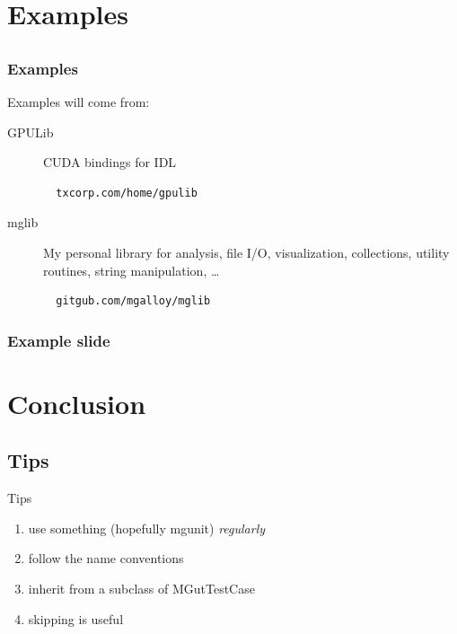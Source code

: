 \documentclass[12pt, handout]{beamer}
\begin{document}
\section{Examples}
\subsection*{}

\begin{frame}[t, fragile]
  \hypertarget{examples}{}
  \frametitle{Examples}
  Examples will come from:

  \begin{description}
    \item[GPULib] CUDA bindings for IDL
\begin{lstlisting}
  txcorp.com/home/gpulib
\end{lstlisting}
\hyperlink{gpulib}{}

    \item[mglib] My personal library for analysis, file I/O, visualization, collections, utility routines, string manipulation, \ldots
\begin{lstlisting}
  gitgub.com/mgalloy/mglib
\end{lstlisting}
  \end{description}
\end{frame}

\begin{frame}[t, fragile]
  \frametitle{Example slide}
\end{frame}


\section{Conclusion}

\subsection{Tips}
\begin{frame}[t]{Tips}
  \begin{enumerate}
    \item use something (hopefully mgunit) {\em regularly}
    \item follow the name conventions
    \item inherit from a subclass of MGutTestCase
    \item skipping is useful
  \end{enumerate}
\end{frame}
\end{document}
